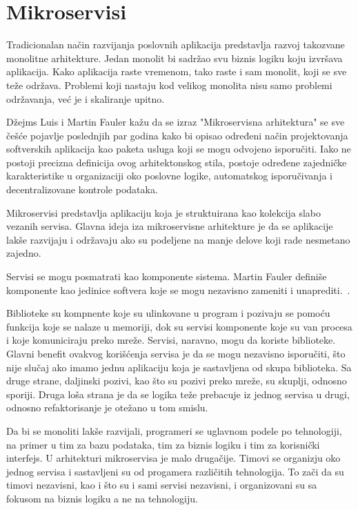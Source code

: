 \section{Mikroservisi}\label{sec:arhitektura-mikroservisi}

Tradicionalan način razvijanja poslovnih aplikacija predstavlja razvoj takozvane monolitne arhitekture. 
Jedan monolit bi sadržao svu biznis logiku koju izvršava aplikacija. Kako aplikacija raste vremenom, 
tako raste i sam monolit, koji se sve teže održava. Problemi koji nastaju kod velikog monolita nisu 
samo problemi održavanja, već je i skaliranje upitno. 

Džejms Luis i Martin Fauler kažu da se izraz "Mikroservisna arhitektura" se sve češće pojavlje poslednjih 
par godina kako bi opisao određeni način projektovanja softverskih aplikacija kao paketa usluga koji se 
mogu odvojeno isporučiti. Iako ne postoji precizna definicija ovog arhitektonskog stila, postoje određene 
zajedničke karakteristike u organizaciji oko poslovne logike, automatskog isporučivanja i decentralizovane 
kontrole podataka.~\cite{martinfowler_microservices} 

Mikroservisi predstavlja aplikaciju koja je struktuirana kao kolekcija slabo vezanih servisa. Glavna 
ideja iza mikroservisne arhitekture je da se aplikacije lakše razvijaju i održavaju ako su podeljene 
na manje delove koji rade nesmetano zajedno.

Servisi se mogu posmatrati kao komponente sistema. Martin Fauler definiše komponente kao jedinice 
softvera koje se mogu nezavisno zameniti i unaprediti.~\cite{martinfowler_software_component}.

Biblioteke su kompnente koje su ulinkovane u program i pozivaju se pomoću funkcija koje se nalaze u 
memoriji, dok su servisi komponente koje su van procesa i koje komuniciraju preko mreže.
Servisi, naravno, mogu da koriste biblioteke. Glavni benefit ovakvog korišćenja servisa je da se mogu 
nezavisno isporučiti, što nije slučaj ako imamo jednu aplikaciju koja je sastavljena od skupa biblioteka.
Sa druge strane, daljinski pozivi, kao što su pozivi preko mreže, su skuplji, odnosno sporiji. 
Druga loša strana je da se logika teže prebacuje iz jednog servisa u drugi, odnosno refaktorisanje je 
otežano u tom smislu.

Da bi se monoliti lakše razvijali, programeri se uglavnom podele po tehnologiji, na primer u tim za 
bazu podataka, tim za biznis logiku i tim za korisnički interfejs. U arhitekturi mikroservisa je malo 
drugačije. Timovi se organizju oko jednog servisa i sastavljeni su od progamera različitih tehnologija.
To zači da su timovi nezavisni, kao i što su i sami servisi nezavisni, i organizovani su sa fokusom na 
biznis logiku a ne na tehnologiju.

